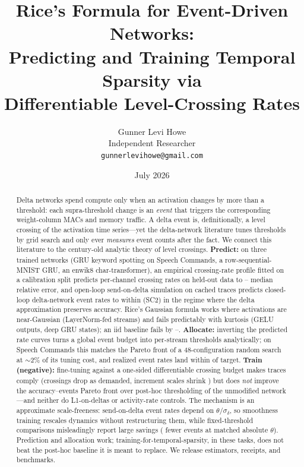 \documentclass[10pt]{article}
\title{Rice's Formula for Event-Driven Networks:\\
Predicting and Training Temporal Sparsity via\\ Differentiable Level-Crossing Rates}
\author{Gunner Levi Howe\\
Independent Researcher\\
\texttt{gunnerlevihowe@gmail.com}}
\date{July 2026}
\begin{document}
\maketitle

\begin{abstract}
Delta networks spend compute only when an activation changes by more than a
threshold: each supra-threshold change is an \emph{event} that triggers the
corresponding weight-column MACs and memory traffic. A delta event is,
definitionally, a level crossing of the activation time series---yet the
delta-network literature tunes thresholds by grid search and only ever
\emph{measures} event counts after the fact. We connect this literature to
the century-old analytic theory of level crossings. \textbf{Predict:} on
three trained networks (GRU keyword spotting on Speech Commands, a
row-sequential-MNIST GRU, an enwik8 char-transformer), an empirical
crossing-rate profile fitted on a calibration split predicts per-channel
crossing rates on held-out data to \EmpMedianSCTwo--\EmpMedianEnwik{} median
relative error, and open-loop send-on-delta simulation on cached traces
predicts closed-loop delta-network event rates to within
\EventOpenloopMaxSCTwo{} (SC2) in the regime where the delta approximation
preserves accuracy. Rice's Gaussian formula works where activations are
near-Gaussian (LayerNorm-fed streams) and fails predictably with kurtosis
(GELU outputs, deep GRU states); an iid baseline fails by
\IidMinSCTwo--\IidMaxSCTwo. \textbf{Allocate:} inverting the predicted rate
curves turns a global event budget into per-stream thresholds analytically;
on Speech Commands this matches the Pareto front of a 48-configuration
random search at $\sim$2\% of its tuning cost, and realized event rates land
within \AllocRealizedErrSCTwo{} of target. \textbf{Train (negative):}
fine-tuning against a one-sided differentiable crossing budget makes traces
comply (crossings drop as demanded, increment scales shrink
\SigmaShrinkPsMNIST{}) but does \emph{not} improve the accuracy--events
Pareto front over post-hoc thresholding of the unmodified network---and
neither do L1-on-deltas or activity-rate controls. The mechanism is an
approximate scale-freeness: send-on-delta event rates depend on
$\theta/\sigma_\delta$, so smoothness training rescales dynamics without
restructuring them, while fixed-threshold comparisons misleadingly report
large savings (\AbsThetaSavingPsMNIST{} fewer events at matched absolute
$\theta$). Prediction and allocation work; training-for-temporal-sparsity,
in these tasks, does not beat the post-hoc baseline it is meant to replace.
We release estimators, receipts, and benchmarks.
\end{abstract}
\end{document}
